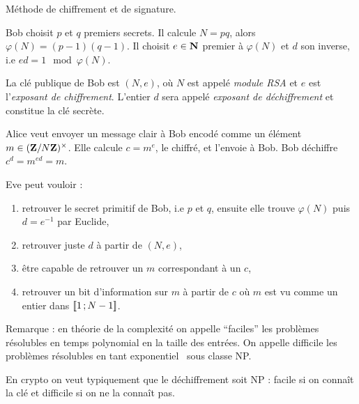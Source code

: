 	\begin{ex}
		Méthode de chiffrement et de signature.
		
		Bob choisit $p$ et $q$ premiers secrets.
		Il calcule $N = pq$, alors $\varphi(N) = (p - 1)(q - 1)$.
		Il choisit $e \in \mathbf{N}$ premier à $\varphi(N)$ et $d$ son inverse, i.e $ed = 1 \mod{\varphi(N)}$.
		
		La clé publique de Bob est $(N,e)$, où $N$ est appelé \textit{module RSA} et $e$ est l'\textit{exposant de chiffrement}.
		L'entier $d$ sera appelé \textit{exposant de déchiffrement} et constitue la clé secrète.
		
		Alice veut envoyer un message clair à Bob encodé comme un élément $m \in (\mathbf{Z} / N\mathbf{Z})^\times$.
		Elle calcule $c = m^e$, le chiffré, et l'envoie à Bob.
		Bob déchiffre $c^d = m^{ed} = m$.
		
		Eve peut vouloir :
		\begin{enumerate}[1 -]
			\item retrouver le secret primitif de Bob, i.e $p$ et $q$, ensuite elle trouve $\varphi(N)$ puis $d = e^{-1}$ par Euclide,
			\item retrouver juste $d$ à partir de $(N,e)$,
			\item être capable de retrouver un $m$ correspondant à un $c$,
			\item retrouver un bit d'information sur $m$ à partir de $c$ où $m$ est vu comme un entier dans $\mathopen{[\![}1\mathclose{}\mathpunct{};N - 1\mathclose{]\!]}$.
		\end{enumerate}
		
		Remarque : en théorie de la complexité on appelle “faciles” les problèmes résolubles en temps polynomial en la taille des entrées.
		On appelle difficile les problèmes résolubles en tant exponentiel \textrightarrow\ sous classe NP.
		
		En crypto on veut typiquement que le déchiffrement soit NP : facile si on connaît la clé et difficile si on ne la connaît pas.
		

\end{ex}
